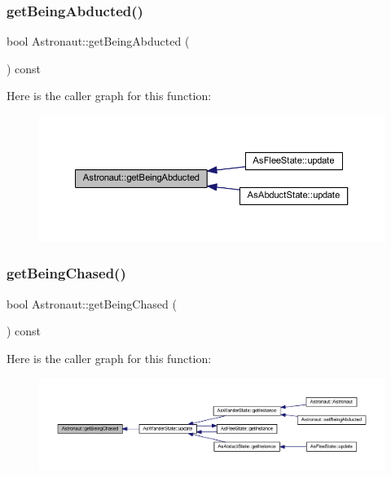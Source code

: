 \subsubsection{\texorpdfstring{get\+Being\+Abducted()}{getBeingAbducted()}}
{\footnotesize\ttfamily bool Astronaut\+::get\+Being\+Abducted (\begin{DoxyParamCaption}{ }\end{DoxyParamCaption}) const}

Here is the caller graph for this function\+:
\nopagebreak
\begin{figure}[H]
\begin{center}
\leavevmode
\includegraphics[width=350pt]{class_astronaut_af372531d99d29adf03595c0a7922ce42_icgraph}
\end{center}
\end{figure}
\mbox{\label{class_astronaut_a261c75322690f57c19f46b1fa714c2e0}} 
\subsubsection{\texorpdfstring{get\+Being\+Chased()}{getBeingChased()}}
{\footnotesize\ttfamily bool Astronaut\+::get\+Being\+Chased (\begin{DoxyParamCaption}{ }\end{DoxyParamCaption}) const}

Here is the caller graph for this function\+:
\nopagebreak
\begin{figure}[H]
\begin{center}
\leavevmode
\includegraphics[width=350pt]{class_astronaut_a261c75322690f57c19f46b1fa714c2e0_icgraph}
\end{center}
\end{figure}
\mbox{\label{class_astronaut_accf210f01ffc0bbeaa3b3a9c0004233f}} 
